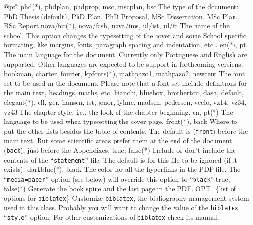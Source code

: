\noindent
\begin{ctabular}{@{}p{\linewidth}@{}}
  \toprule
    {phd(*), phdplan, phdprop, msc, mscplan, bsc}%
    {The type of the document: PhD Thesis (default), PhD Plan, PhD Proposal, MSc Dissertation, MSc Plan, BSc Report}
    \midrule
		{nova/fct(*), nova/fcsh, nova/ims, ul/ist, ul/fc}%
    {The name of the school. This option changes the typesetting of the cover and some School specific formating, like margins, fonts, paragraph spacing and indentation, etc…}
    \midrule
    {en(*), pt}%
    {The main language for the document.  Currently only Portuguese and English are supported.  Other languages are expected to be support in forthcoming versions.}
    \midrule
    {bookman, charter, fourier, kpfonts(*), mathpazo1, mathpazo2, newcent}%
    {The font set to be used in the document.  Please note that a font set include definitions for the main text, headings, maths, etc.}
    \midrule
    {bianchi, bluebox, brotherton, dash, default, elegant(*), ell, ger, hansen, ist, jenor, lyhne, madsen, pedersen, veelo, vz14, vz34, vz43}%
    {The chapter style, i.e., the look of the chapter beginning.}
    \midrule
    {en, pt(*)}%
    {The language to be used when typesetting the cover page.}
    \midrule
    {front(*), back}%
    {Where to put the other lists besides the table of contents. The default is (\texttt{front}) before the main text.  But some scientific areas prefer them at the end of the document (\texttt{back}), just before the Appendixes.}
    \midrule
    {true, false(*)}%
    {Include or don't include the contents of the “\texttt{statement}” file. The default is for this file to be ignored (if it exists).}
    \midrule
    {darkblue(*), black}%
    {The color for all the hyperlinks in the PDF file.  The “\texttt{media=paper}” option (see below) will override this option to “\texttt{black}”}
    \midrule
    {true, false(*)}%
    {Generate the book spine and the last page in the PDF.}
    \midrule
    {OPT=\{list of options for \texttt{biblatex}\}}%
    {Customize \texttt{biblatex}, the bibliography management system used in this class. Probably you will want to change the value of the \texttt{biblatex} “\texttt{style}” option. For other customizations of \texttt{biblatex} check its manual.}
    \midrule

\end{ctabular}
